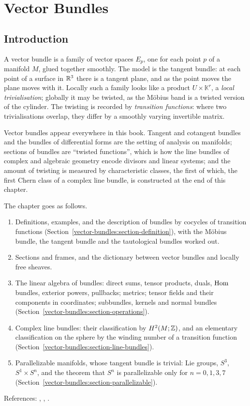 \chapter{Vector Bundles}\label{vector-bundles}

\section{Introduction}\label{vector-bundles:section-introduction}

A vector bundle is a family of vector spaces $E_p$, one for each point $p$ of a manifold $M$, glued together smoothly. The model is the tangent bundle: at each point of a
surface in $\mathbb{R}^3$ there is a tangent plane, and as the point moves the plane moves with it. Locally such a family looks like a product $U \times \mathbb{K}^r$, a
\emph{local trivialisation}; globally it may be twisted, as the M\"obius band is a twisted version of the cylinder. The twisting is recorded by \emph{transition functions}:
where two trivialisations overlap, they differ by a smoothly varying invertible matrix.

Vector bundles appear everywhere in this book. Tangent and cotangent bundles and the bundles of differential forms are the setting of analysis on manifolds; sections of
bundles are ``twisted functions'', which is how the line bundles of complex and algebraic geometry encode divisors and linear systems; and the amount of twisting is measured
by characteristic classes, the first of which, the first Chern class of a complex line bundle, is constructed at the end of this chapter.

The chapter goes as follows.
\begin{enumerate}
\item Definitions, examples, and the description of bundles by cocycles of transition functions (Section~\ref{vector-bundles:section-definition}), with the M\"obius bundle,
the tangent bundle and the tautological bundles worked out.
\item Sections and frames, and the dictionary between vector bundles and locally free sheaves.
\item The linear algebra of bundles: direct sums, tensor products, duals, $\operatorname{Hom}$ bundles, exterior powers, pullbacks; metrics; tensor fields and their components in coordinates; subbundles, kernels and normal bundles
(Section~\ref{vector-bundles:section-operations}).
\item Complex line bundles: their classification by $H^2(M; \mathbb{Z})$, and an elementary classification on the sphere by the winding number of a transition function
(Section~\ref{vector-bundles:section-line-bundles}).
\item Parallelizable manifolds, whose tangent bundle is trivial: Lie groups, $S^3$, $S^1 \times S^n$, and the theorem that $S^n$ is parallelizable only for $n = 0, 1, 3, 7$
(Section~\ref{vector-bundles:section-parallelizable}).
\end{enumerate}
References: \cite{lee-smooth-manifolds}, \cite{milnor-stasheff}, \cite[Chapter 0]{griffiths-harris}.

